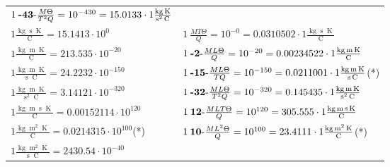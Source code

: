 \begin{center}
\begin{longtable}{l l}
	{\color{black}$1\:\text{\textbf{-43}-} \frac{M\Theta}{T^2Q}=10^{-430} = 15.0133 \cdot 1 \bm{\mathrm{ }}\frac{\operatorname{kg}\operatorname{K}}{\operatorname{s}^2\operatorname{C}}$}\\
{\color{black}$1 \bm{\mathrm{ }}\frac{\operatorname{kg}\operatorname{s}\operatorname{K}}{\operatorname{C}} = 15.1413\cdot10^{0} $}&
	{\color{black}$1\:\text{} \frac{MT\Theta}{Q}=10^{-0} = 0.0310502 \cdot 1 \bm{\mathrm{ }}\frac{\operatorname{kg}\operatorname{s}\operatorname{K}}{\operatorname{C}}$}\\
{\color{black}$1 \bm{\mathrm{ }}\frac{\operatorname{kg}\operatorname{m}\operatorname{K}}{\operatorname{C}} = 213.535\cdot10^{-20} $}&
	{\color{black}$1\:\text{\textbf{-2}-} \frac{ML\Theta}{Q}=10^{-20} = 0.00234522 \cdot 1 \bm{\mathrm{ }}\frac{\operatorname{kg}\operatorname{m}\operatorname{K}}{\operatorname{C}}$}\\
{\color{black}$1 \bm{\mathrm{ }}\frac{\operatorname{kg}\operatorname{m}\operatorname{K}}{\operatorname{s}\operatorname{C}} = 24.2232\cdot10^{-150} $}&
	{\color{black}$1\:\text{\textbf{-15}-} \frac{ML\Theta}{TQ}=10^{-150} = 0.0211001 \cdot 1 \bm{\mathrm{ }}\frac{\operatorname{kg}\operatorname{m}\operatorname{K}}{\operatorname{s}\operatorname{C}}$}\quad(*)\\
{\color{black}$1 \bm{\mathrm{ }}\frac{\operatorname{kg}\operatorname{m}\operatorname{K}}{\operatorname{s}^2\operatorname{C}} = 3.14121\cdot10^{-320} $}&
	{\color{black}$1\:\text{\textbf{-32}-} \frac{ML\Theta}{T^2Q}=10^{-320} = 0.145435 \cdot 1 \bm{\mathrm{ }}\frac{\operatorname{kg}\operatorname{m}\operatorname{K}}{\operatorname{s}^2\operatorname{C}}$}\\
{\color{black}$1 \bm{\mathrm{ }}\frac{\operatorname{kg}\operatorname{m}\operatorname{s}\operatorname{K}}{\operatorname{C}} = 0.00152114\cdot10^{120} $}&
	{\color{black}$1\:\text{\textbf{12}-} \frac{MLT\Theta}{Q}=10^{120} = 305.555 \cdot 1 \bm{\mathrm{ }}\frac{\operatorname{kg}\operatorname{m}\operatorname{s}\operatorname{K}}{\operatorname{C}}$}\\
{\color{black}$1 \bm{\mathrm{ }}\frac{\operatorname{kg}\operatorname{m}^2\operatorname{K}}{\operatorname{C}} = 0.0214315\cdot10^{100} $}\quad(*)&
	{\color{black}$1\:\text{\textbf{10}-} \frac{ML^2\Theta}{Q}=10^{100} = 23.4111 \cdot 1 \bm{\mathrm{ }}\frac{\operatorname{kg}\operatorname{m}^2\operatorname{K}}{\operatorname{C}}$}\quad(*)\\
{\color{black}$1 \bm{\mathrm{ }}\frac{\operatorname{kg}\operatorname{m}^2\operatorname{K}}{\operatorname{s}\operatorname{C}} = 2430.54\cdot10^{-40} $}&

\end{longtable}
\end{center}
